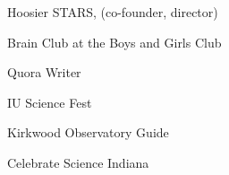 \newpage
{}

\begin{cventries}

  \cventry
    {} %
    {} %
    {} %
    {} %
    {
      \begin{cvitems} %
	\item{Hoosier STARS, (co-founder, director)}
        \item {Brain Club at the Boys and Girls Club}
        \item{Quora Writer}
	\item{IU Science Fest}
	\item{Kirkwood Observatory Guide}
	\item{Celebrate Science Indiana}
      \end{cvitems}
    }

\end{cventries}

	




